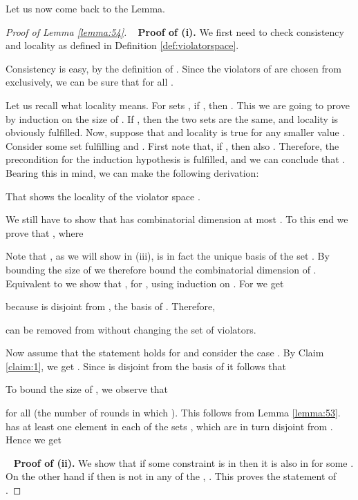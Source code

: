 \documentclass[12pt]{article}
\theoremstyle{remark}
\begin{document}
    Let us now come back to the Lemma.
    \begin{proof}[Proof of Lemma \ref{lemma:54}]
    ~\newline
     \textbf{Proof of (i).}
    We first need to check consistency and locality as defined in Definition \ref{def:violatorspace}.
    
    Consistency is easy, by the definition of . Since the violators of  are 
chosen
    from  exclusively, we can be sure that  for all .
    
    Let us recall what locality means. For sets , if , then
    . This we are going to prove by induction on the size of .
    If , then the two sets are the same, and locality is obviously fulfilled. Now, 
suppose
    that  and locality is true for any smaller value . Consider some set  
fulfilling
     and . 
    First note that, if , then also .
    Therefore, the precondition for the induction hypothesis is fulfilled, and we can conclude that
    .  Bearing this in mind, we can make the following derivation:
    
    That shows the locality of the violator space .
    
    We still have to show that   has combinatorial dimension at most .
    To this end we prove that , where
    
     Note that , as we will show in {(iii)}, is in fact the unique basis of the set .
     By bounding the size of  we therefore bound the combinatorial dimension of
    . 
     Equivalent to   we show that , for , using induction on . For
     we get
    
    because  is disjoint from , the basis of . Therefore,
    
    can be removed from  without changing the set of violators.
    
    Now assume that the statement holds for  and consider the case . By Claim 
    \ref{claim:1}, we get .
    Since  is disjoint from the basis  of  it follows that
    
    
    To bound the size of , we observe that
    
    for all  (the number of rounds in which ). This follows
    from Lemma \ref{lemma:53}.  has at least one element in each of the  sets
    , which are in turn disjoint from . Hence we get
    
    
    ~\newline
     \textbf{Proof of (ii).}
     We show that if some constraint  is in  then it is also in  for
     some . On the other hand if  then  is not in
     any of the , . This proves the statement of .
     

\end{proof}
\end{document}
